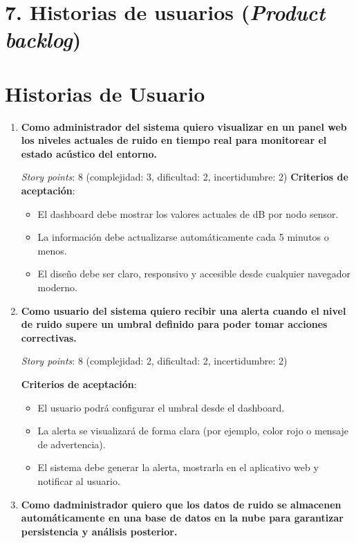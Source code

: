 \documentclass[
11pt, %
]{charter}
\begin{document}
\section{7. Historias de usuarios (\textit{Product backlog})}
\label{sec:backlog}

\section{Historias de Usuario}

\begin{enumerate}
    \item \textbf{Como administrador del sistema quiero visualizar en un panel web los niveles actuales de ruido en tiempo real para monitorear el estado acústico del entorno.}

    \textit{Story points}: 8 (complejidad: 3, dificultad: 2, incertidumbre: 2)
    \clearpage
    \textbf{Criterios de aceptación}:
    \begin{itemize}
        \item El dashboard debe mostrar los valores actuales de dB por nodo sensor.
        \item La información debe actualizarse automáticamente cada 5 minutos o menos.
        \item El diseño debe ser claro, responsivo y accesible desde cualquier navegador moderno.
    \end{itemize}

    \item \textbf{Como usuario del sistema quiero recibir una alerta cuando el nivel de ruido supere un umbral definido para poder tomar acciones correctivas.}

    \textit{Story points}: 8 (complejidad: 2, dificultad: 2, incertidumbre: 2)

    \textbf{Criterios de aceptación}:
    \begin{itemize}
        \item El usuario podrá configurar el umbral desde el dashboard.
        \item La alerta se visualizará de forma clara (por ejemplo, color rojo o mensaje de advertencia).
        \item El sistema debe generar la alerta, mostrarla en el aplicativo web y notificar al usuario.
    \end{itemize}

    \item \textbf{Como dadministrador quiero que los datos de ruido se almacenen automáticamente en una base de datos en la nube para garantizar persistencia y análisis posterior.}


\end{enumerate}
\end{document}
